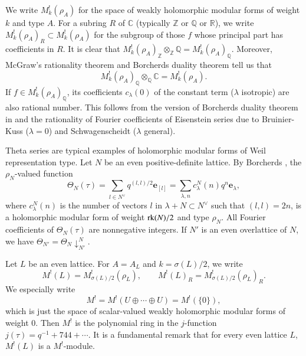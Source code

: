 \documentclass[12pt]{amsart}
\numberwithin{equation}{section}
\theoremstyle{definition}
\theoremstyle{remark}
\newcommand{\Z}{\mathbb{Z}}
\newcommand{\Q}{\mathbb{Q}}
\newcommand{\R}{\mathbb{R}}
\newcommand{\C}{\mathbb{C}}
\newcommand{\elambda}{{\mathbf e}_{\lambda}}
\newcommand{\ML}{M^{!}(L)}
\newcommand{\MLR}{M^{!}(L)_{R}}
\begin{document}
We write $M^{!}_{k}(\rho_A)$ for the space of weakly holomorphic modular forms of weight $k$ and type $A$. 
For a subring $R$ of ${\C}$ (typically ${\Z}$ or ${\Q}$ or ${\R}$), 
we write $M^{!}_{k}(\rho_A)_{R} \subset M^{!}_{k}(\rho_A)$ 
for the subgroup of those $f$ whose principal part has coefficients in $R$. 
It is clear that 
$M^{!}_{k}(\rho_A)_{{\Z}}\otimes_{{\Z}}{\Q} = M^{!}_{k}(\rho_A)_{{\Q}}$. 
Moreover, 
McGraw's rationality theorem \cite{Mc} and Borcherds duality theorem 
tell us that 
\begin{equation*}
M^{!}_{k}(\rho_A)_{{\Q}}\otimes_{{\Q}}{\C} = M^{!}_{k}(\rho_A). 
\end{equation*}
If $f\in M^{!}_{k}(\rho_A)_{{\Q}}$, its coefficients $c_{\lambda}(0)$ of the constant term ($\lambda$ isotropic) 
are also rational number. 
This follows from the version of Borcherds duality theorem in \cite{Bo00a} 
and the rationality of Fourier coefficients of Eisenstein series 
due to Bruinier-Kuss \cite{B-K} ($\lambda=0$) and 
Schwagenscheidt \cite{Sc} ($\lambda$ general). 


Theta series are typical examples of holomorphic modular forms of Weil representation type. 
Let $N$ be an even positive-definite lattice. 
By Borcherds \cite{Bo98}, 
the $\rho_N$-valued function 
\begin{equation*}
\Theta_{N}(\tau) 
= \sum_{l\in N^{\vee}} q^{(l, l)/2}\mathbf{e}_{[l]} 
= \sum_{\lambda, n}c_{\lambda}^{N}(n)q^{n}{\elambda},  
\end{equation*}
where $c_{\lambda}^{N}(n)$ is the number of vectors $l$ in $\lambda+N\subset N^{\vee}$ such that $(l, l)=2n$, 
is a holomorphic modular form of weight ${\rm rk}(N)/2$ and type $\rho_{N}$. 
All Fourier coefficients of $\Theta_{N}(\tau)$ are nonnegative integers. 
If $N'$ is an even overlattice of $N$, we have 
$\Theta_{N'}=\Theta_{N}\!\downarrow^{N}_{N'}$. 


Let $L$ be an even lattice. 
For $A=A_{L}$ and $k=\sigma(L)/2$, 
we write 
\begin{equation*}
{\ML} = M^{!}_{\sigma(L)/2}(\rho_{L}), \qquad 
{\MLR} = M^{!}_{\sigma(L)/2}(\rho_{L})_{R}. 
\end{equation*}
We especially write 
\begin{equation*}
M^{!}=M^{!}(U\oplus \cdots \oplus U)=M^{!}(\{ 0 \}), 
\end{equation*} 
which is just the space of scalar-valued weakly holomorphic modular forms of weight $0$. 
Then $M^{!}$ is the polynomial ring in the $j$-function 
$j(\tau)=q^{-1}+744+ \cdots$. 
It is a fundamental remark that for every even lattice $L$, ${\ML}$ is a $M^{!}$-module. 
\end{document}
